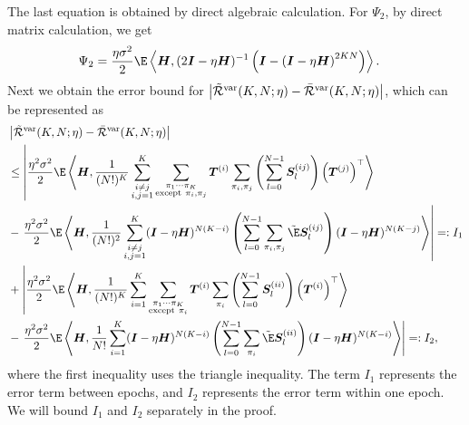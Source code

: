 The last equation is obtained by direct algebraic calculation.
For $\Psi_2$, by direct matrix calculation, we get
\begin{align*}
    \Psi_2&=\frac{\eta\sigma^2}{2}\E\inp{\mH}{(2\mI-\eta\mH)^{-1}\left(\mI-\left(\mI-\eta\mH\right)^{2KN}\right)}.
\end{align*}
Next we obtain the error bound for $\left|\Tilde{\mathcal{R}}^{\mathrm{var}}(K,N;\eta) - \bar{\mathcal{R}}^{\mathrm{var}}(K,N;\eta)\right|$, which can be represented as
\begin{align*}
    &\left|\Tilde{\cR}^{\var}(K,N;\eta) - \bar{\cR}^{\var}(K,N;\eta)\right| \\
    &\leq\left|\frac{\eta^2\sigma^2}{2}\E\inp{\mH}{\frac{1}{(N!)^K}\sum_{\substack{i\neq j \\i,j=1}}^K\sum_{\substack{\pi_1\cdots \pi_K \\ \text{except} ~\pi_i, \pi_j}}\mT^{(i)}\sum_{\pi_i, \pi_j}\left(\sum_{l=0}^{N-1}\mS_l^{(ij)}\right)\left(\mT^{(j)}\right)^{\top}}\right. \\
    &-\left.\frac{\eta^2\sigma^2}{2}\E\inp{\mH}{\frac{1}{(N!)^2}\sum_{\substack{i\neq j \\i,j=1}}^K(\mI-\eta\mH)^{N(K-i)}\left(\sum_{l=0}^{N-1}\sum_{\pi_i, \pi_j}\fakeE \mS_l^{(ij)}\right)(\mI-\eta\mH)^{N(K-j)}}\right| =:I_1\\
    &+\left|\frac{\eta^2\sigma^2}{2}\E\inp{\mH}{\frac{1}{(N!)^K}\sum_{i=1}^K\sum_{\substack{\pi_1\cdots \pi_K \\ \text{except} ~\pi_i}}\mT^{(i)}\sum_{\pi_i}\left(\sum_{l=0}^{N-1}\mS_l^{(ii)}\right)\left(\mT^{(i)}\right)^{\top}}\right. \\
    &-\left.\frac{\eta^2\sigma^2}{2}\E\inp{\mH}{\frac{1}{N!}\sum_{i=1}^K(\mI-\eta\mH)^{N(K-i)}\left(\sum_{l=0}^{N-1}\sum_{\pi_i}\fakeE \mS_l^{(ii)}\right)(\mI-\eta\mH)^{N(K-i)}}\right| =:I_2,
\end{align*}
where the first inequality uses the triangle inequality. The term $I_1$ represents the error term between epochs, and $I_2$ represents the error term within one epoch. We will bound $I_1$ and $I_2$ separately in the proof.
